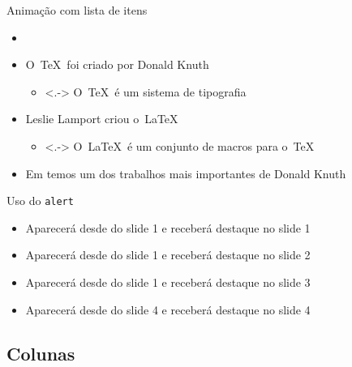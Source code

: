 \documentclass[aspectratio=169]{beamer}
\begin{document}
\begin{frame}{Animação com lista de itens}
\begin{itemize}[<+->]
    \item{} 
    \item O~\TeX~foi criado por Donald Knuth
    \begin{itemize}
        \item<.-> O~\TeX~é um sistema de tipografia 
    \end{itemize}
    \item Leslie Lamport criou o~\LaTeX~\cite{lamport94}
    \begin{itemize}
        \item<.-> O~\LaTeX~é um conjunto de macros para o~\TeX 
    \end{itemize}
    \item Em \textcite{knuth74} temos um dos trabalhos mais importantes de Donald Knuth
    
\end{itemize}
\end{frame}

\begin{frame}{Uso do \texttt{alert}}
    \begin{itemize}
        \item<1-| alert@1> Aparecerá desde do slide 1 e receberá destaque no slide 1
        \item<1-| alert@2> Aparecerá desde do slide 1 e receberá destaque no slide 2
        \item<1-| alert@3> Aparecerá desde do slide 1 e receberá destaque no slide 3
        \item<4-| alert@4> Aparecerá desde do slide 4 e receberá destaque no slide 4
    \end{itemize} 
\end{frame}

\subsection{Colunas}
\end{document}
